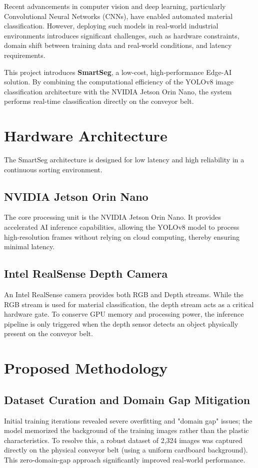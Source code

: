 \documentclass[conference,onecolumn]{IEEEtran}
\begin{document}
Recent advancements in computer vision and deep learning, particularly Convolutional Neural Networks (CNNs), have enabled automated material classification. However, deploying such models in real-world industrial environments introduces significant challenges, such as hardware constraints, domain shift between training data and real-world conditions, and latency requirements.

This project introduces \textbf{SmartSeg}, a low-cost, high-performance Edge-AI solution. By combining the computational efficiency of the YOLOv8 image classification architecture with the NVIDIA Jetson Orin Nano, the system performs real-time classification directly on the conveyor belt. 

\section{Hardware Architecture}
The SmartSeg architecture is designed for low latency and high reliability in a continuous sorting environment.

\subsection{NVIDIA Jetson Orin Nano}
The core processing unit is the NVIDIA Jetson Orin Nano. It provides accelerated AI inference capabilities, allowing the YOLOv8 model to process high-resolution frames without relying on cloud computing, thereby ensuring minimal latency.

\subsection{Intel RealSense Depth Camera}
An Intel RealSense camera provides both RGB and Depth streams. While the RGB stream is used for material classification, the depth stream acts as a critical hardware gate. To conserve GPU memory and processing power, the inference pipeline is only triggered when the depth sensor detects an object physically present on the conveyor belt.



\section{Proposed Methodology}

\subsection{Dataset Curation and Domain Gap Mitigation}
Initial training iterations revealed severe overfitting and "domain gap" issues; the model memorized the background of the training images rather than the plastic characteristics. To resolve this, a robust dataset of 2,324 images was captured directly on the physical conveyor belt (using a uniform cardboard background). This zero-domain-gap approach significantly improved real-world performance. 
\end{document}
